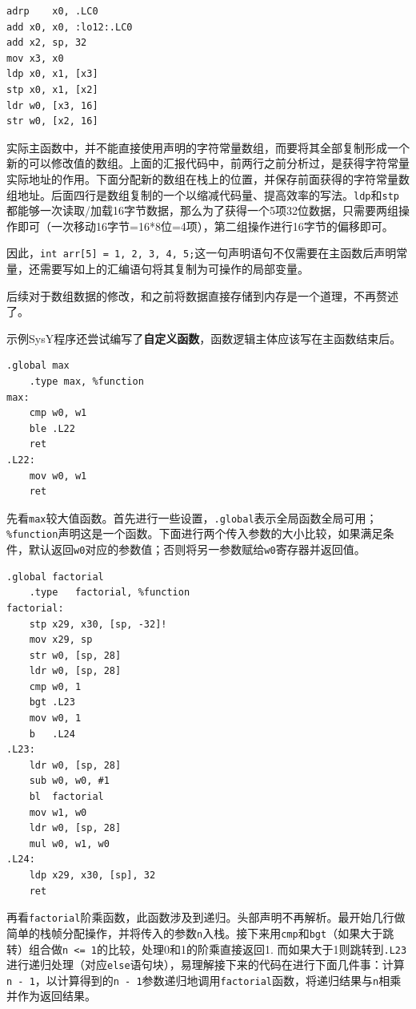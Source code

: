 \documentclass[UTF8,a4paper,10pt]{ctexart}
\begin{document}
\begin{lstlisting}[frame=trbl,language={[x86masm]Assembler}]
adrp	x0, .LC0
add	x0, x0, :lo12:.LC0
add	x2, sp, 32
mov	x3, x0
ldp	x0, x1, [x3]
stp	x0, x1, [x2]
ldr	w0, [x3, 16]
str	w0, [x2, 16]
\end{lstlisting}

实际主函数中，并不能直接使用声明的字符常量数组，而要将其全部复制形成一个新的可以修改值的数组。上面的汇报代码中，前两行之前分析过，是获得字符常量实际地址的作用。下面分配新的数组在栈上的位置，并保存前面获得的字符常量数组地址。后面四行是数组复制的一个以缩减代码量、提高效率的写法。\texttt{ldp}和\texttt{stp}都能够一次读取/加载16字节数据，那么为了获得一个5项32位数据，只需要两组操作即可（一次移动16字节=16*8位=4项），第二组操作进行16字节的偏移即可。

因此，\texttt{int arr[5] = {1, 2, 3, 4, 5};}这一句声明语句不仅需要在主函数后声明常量，还需要写如上的汇编语句将其复制为可操作的局部变量。

后续对于数组数据的修改，和之前将数据直接存储到内存是一个道理，不再赘述了。

\vspace{1em}

示例SysY程序还尝试编写了\textbf{自定义函数}，函数逻辑主体应该写在主函数结束后。
\begin{lstlisting}[frame=trbl,language={[x86masm]Assembler}]
	.global	max
	.type max, %function
max:
    cmp w0, w1
    ble .L22
    ret
.L22:
    mov w0, w1
    ret
\end{lstlisting}

先看\texttt{max}较大值函数。首先进行一些设置，\texttt{.global}表示全局函数全局可用；\texttt{\%function}声明这是一个函数。下面进行两个传入参数的大小比较，如果满足条件，默认返回\texttt{w0}对应的参数值；否则将另一参数赋给\texttt{w0}寄存器并返回值。

\begin{lstlisting}[frame=trbl,language={[x86masm]Assembler}]
	.global	factorial
	.type	factorial, %function
factorial:
	stp	x29, x30, [sp, -32]!
	mov	x29, sp
	str	w0, [sp, 28]
	ldr	w0, [sp, 28]
	cmp	w0, 1
	bgt	.L23
	mov	w0, 1
	b	.L24
.L23:
	ldr	w0, [sp, 28]
	sub	w0, w0, #1
	bl	factorial
	mov	w1, w0
	ldr	w0, [sp, 28]
	mul	w0, w1, w0
.L24:
	ldp	x29, x30, [sp], 32
	ret
\end{lstlisting}

再看\texttt{factorial}阶乘函数，此函数涉及到递归。头部声明不再解析。最开始几行做简单的栈帧分配操作，并将传入的参数\texttt{n}入栈。接下来用\texttt{cmp}和\texttt{bgt}（如果大于跳转）组合做\texttt{n <= 1}的比较，处理0和1的阶乘直接返回1. 而如果大于1则跳转到\texttt{.L23}进行递归处理（对应\texttt{else}语句块），易理解接下来的代码在进行下面几件事：计算\texttt{n - 1}，以计算得到的\texttt{n - 1}参数递归地调用\texttt{factorial}函数，将递归结果与\texttt{n}相乘并作为返回结果。
\end{document}
